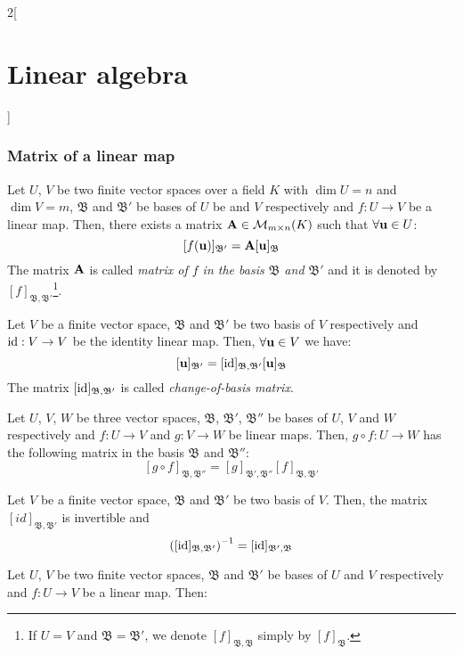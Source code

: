 \documentclass[../../../main.tex]{subfiles}
\begin{document}
\begin{multicols}{2}[\section{Linear algebra}]
  \subsubsection{Matrix of a linear map}
  \begin{prop}
    Let $U$, $V$ be two finite vector spaces over a field $K$ with $\dim U=n$ and $\dim V=m$, $\mathfrak{B}$ and $\mathfrak{B}'$ be bases of $U$ be and $V$ respectively and $f:U\rightarrow V$ be a linear map. Then, there exists a matrix $\boldsymbol{\mathrm{A}}\in\mathcal{M}_{m\times n}(K)$ such that $\forall\boldsymbol{\mathrm{u}}\in U$: $$[f(\boldsymbol{\mathrm{u}})]_{\mathfrak{B}'}=\boldsymbol{\mathrm{A}}[\boldsymbol{\mathrm{u}}]_\mathfrak{B}$$
    The matrix $\boldsymbol{\mathrm{A}}$ is called \textit{matrix of $f$ in the basis $\mathfrak{B}$ and $\mathfrak{B}'$} and it is denoted by $[f]_{\mathfrak{B},\mathfrak{B}'}$\footnote{If $U=V$ and $\mathfrak{B}=\mathfrak{B}'$, we denote $[f]_{\mathfrak{B},\mathfrak{B}}$ simply by $[f]_{\mathfrak{B}}$.}.
  \end{prop}
  \begin{corollary}
    Let $V$ be a finite vector space, $\mathfrak{B}$ and $\mathfrak{B}'$ be two basis of $V$ respectively and $\mathrm{id}:V\rightarrow V$ be the identity linear map. Then, $\forall\boldsymbol{\mathrm{u}}\in V$ we have: $$[\boldsymbol{\mathrm{u}}]_{\mathfrak{B}'}=[\mathrm{id}]_{\mathfrak{B},\mathfrak{B}'}[\boldsymbol{\mathrm{u}}]_\mathfrak{B}$$ The matrix $[\mathrm{id}]_{\mathfrak{B},\mathfrak{B}'}$ is called \textit{change-of-basis matrix}.
  \end{corollary}
  \begin{prop}
    Let $U$, $V$, $W$ be three vector spaces, $\mathfrak{B}$, $\mathfrak{B}'$, $\mathfrak{B}''$ be bases of $U$, $V$ and $W$ respectively and $f:U\rightarrow V$ and $g:V\rightarrow W$ be linear maps. Then, $g\circ f:U\rightarrow W$ has the following matrix in the basis $\mathfrak{B}$ and $\mathfrak{B}''$: $$[g\circ f]_{\mathfrak{B},\mathfrak{B}''}=[g]_{\mathfrak{B}',\mathfrak{B}''}[f]_{\mathfrak{B},\mathfrak{B}'}$$
  \end{prop}
  \begin{corollary}
    Let $V$ be a finite vector space, $\mathfrak{B}$ and $\mathfrak{B}'$ be two basis of $V$. Then, the matrix $[id]_{\mathfrak{B},\mathfrak{B}'}$ is invertible and $${\left([\mathrm{id}]_{\mathfrak{B},\mathfrak{B}'}\right)}^{-1}=[\mathrm{id}]_{\mathfrak{B}',\mathfrak{B}}$$
  \end{corollary}
  \begin{corollary}
    Let $U$, $V$ be two finite vector spaces, $\mathfrak{B}$ and $\mathfrak{B}'$ be bases of $U$ and $V$ respectively and $f:U\rightarrow V$ be a linear map. Then:

\end{corollary}
\end{multicols}
\end{document}
